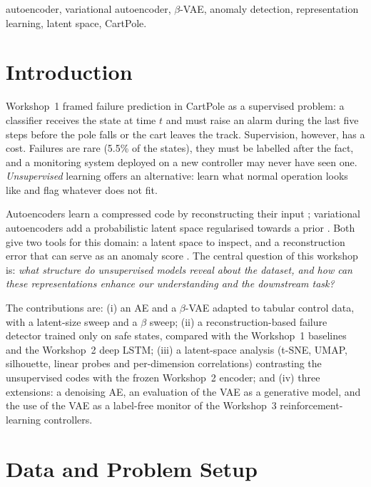 \documentclass[conference]{IEEEtran}
\begin{document}
\begin{IEEEkeywords}
autoencoder, variational autoencoder, $\beta$-VAE, anomaly detection, representation learning, latent space, CartPole.
\end{IEEEkeywords}

\section{Introduction}
Workshop~1 framed failure prediction in CartPole \cite{barto1983,brockman2016} as a
supervised problem: a classifier receives the state at time $t$ and must raise an alarm
during the last five steps before the pole falls or the cart leaves the track. Supervision,
however, has a cost. Failures are rare (5.5\% of the states), they must be
labelled after the fact, and a monitoring system deployed on a new controller may never have
seen one. \emph{Unsupervised} learning offers an alternative: learn what normal operation
looks like and flag whatever does not fit.

Autoencoders learn a compressed code by reconstructing their input
\cite{hinton2006,goodfellow2016}; variational autoencoders add a probabilistic latent space
regularised towards a prior \cite{kingma2014,doersch2016}. Both give two tools for this
domain: a latent space to inspect, and a reconstruction error that can serve as an anomaly
score \cite{chalapathy2019}. The central question of this workshop is: \emph{what structure
do unsupervised models reveal about the dataset, and how can these representations enhance
our understanding and the downstream task?}

The contributions are:
(i) an AE and a $\beta$-VAE adapted to tabular control data, with a latent-size sweep and a
$\beta$ sweep;
(ii) a reconstruction-based failure detector trained only on safe states, compared with the
Workshop~1 baselines and the Workshop~2 deep LSTM;
(iii) a latent-space analysis (t-SNE, UMAP, silhouette, linear probes and per-dimension
correlations) contrasting the unsupervised codes with the frozen Workshop~2 encoder; and
(iv) three extensions: a denoising AE, an evaluation of the VAE as a generative model, and
the use of the VAE as a label-free monitor of the Workshop~3 reinforcement-learning
controllers.

\section{Data and Problem Setup}
\end{document}
